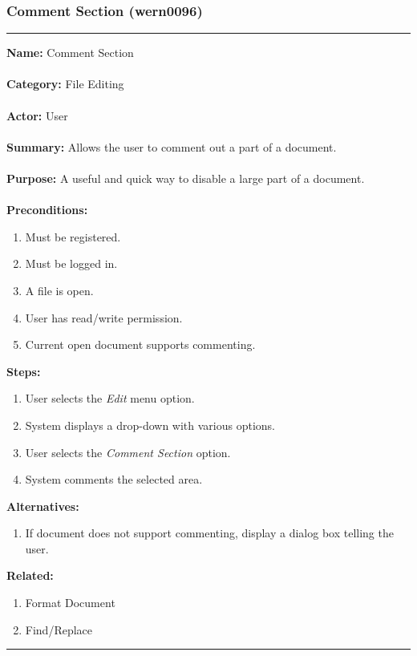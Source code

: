 \documentclass[11pt]{report}
\begin{document}
\subsubsection{Comment Section (wern0096)}
\vspace{2pt}
\hrule
\vspace{8pt}
	\noindent\textbf{Name:} Comment Section \\ \\
	\textbf{Category:} File Editing \\ \\
	\textbf{Actor:} User \\ \\
	\textbf{Summary:} Allows the user to comment out a part of a document. \\ \\
	\textbf{Purpose:} A useful and quick way to disable a large part of a document. \\ \\
	\textbf{Preconditions:} 
	\begin{enumerate}
		\item Must be registered.
		\item Must be logged in.
		\item A file is open.
		\item User has read/write permission.
		\item Current open document supports commenting.
	\end{enumerate}
	\textbf{Steps:}
	\begin{enumerate}
		\item User selects the \textit{Edit} menu option.
		\item System displays a drop-down with various options.
		\item User selects the \textit{Comment Section} option.
		\item System comments the selected area.
	\end{enumerate}
	\textbf{Alternatives:}
	\begin{enumerate}
		\item If document does not support commenting, display a dialog box telling the user.
	\end{enumerate}
	\textbf{Related:}
	\begin{enumerate}
		\item Format Document
		\item Find/Replace
	\end{enumerate}
\vspace{8pt}
\hrule
\newpage
\end{document}
